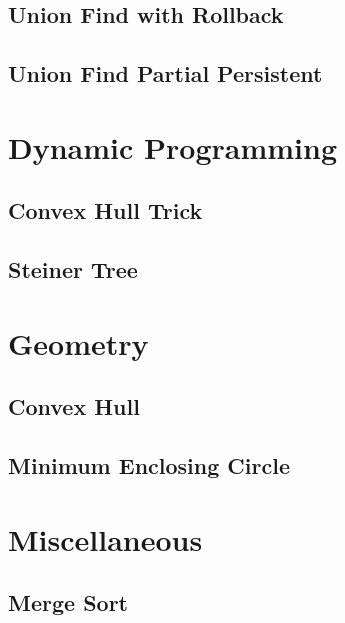 \subsection{Union Find with Rollback}
\raggedbottom
\hrulefill
\subsection{Union Find Partial Persistent}
\raggedbottom
\hrulefill

\section{Dynamic Programming}
\subsection{Convex Hull Trick}
\raggedbottom
\hrulefill
\subsection{Steiner Tree}
\raggedbottom
\hrulefill

\section{Geometry}
\subsection{Convex Hull}
\raggedbottom
\hrulefill
\subsection{Minimum Enclosing Circle}
\raggedbottom
\hrulefill

\section{Miscellaneous}
\subsection{Merge Sort}
\raggedbottom
\hrulefill
